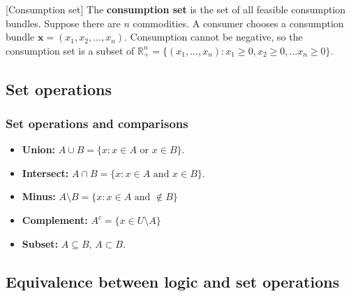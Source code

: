 \documentclass[compress]{beamer}
\def\Re{\mathbb{R}}
\begin{document}
\begin{frame}
  \begin{example}\label{ex:conset}[Consumption set]
    The \textbf{consumption set} is the set of all feasible consumption
    bundles. Suppose there are $n$ commodities. A consumer chooses a
    consumption bundle $\mathbf{x} = (x_1, x_2, ..., x_n)$. Consumption
    cannot be negative, so the consumption set is a subset of $\Re^n_+ =
    \{(x_1, ..., x_n) : x_1 \geq 0, x_2 \geq 0, ... x_n \geq 0 \}$.
  \end{example}
\end{frame}

\subsection{Set operations}

\begin{frame}
  \frametitle{Set operations and comparisons}
  \begin{itemize}
  \item \textbf{Union:} $A \cup B = \{x: x\in A \text{ or } x \in B\}$.
  \item \textbf{Intersect:} $A \cap B = \{x: x \in A \text{ and } x \in
    B\}$. 
  \item \textbf{Minus:} $A \setminus B = \{ x: x\in A \text{ and }
    \not\in B \}$
  \item \textbf{Complement:} $A^c = \{x \in U \setminus A\}$
  \item \textbf{Subset:} $A \subseteq B$, $A \subset B$.
  \end{itemize}
\end{frame}

\subsection{Equivalence between logic and set
  operations \label{s:setLogic}} 
\end{document}
